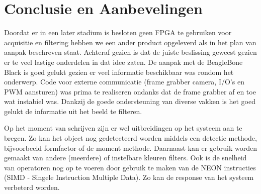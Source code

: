 \chapter{Conclusie en Aanbevelingen}
\label{chap:conclusion}


Doordat er in een later stadium is besloten geen FPGA te gebruiken voor 
acquisitie en filtering hebben we een ander product opgeleverd als in 
het plan van aanpak beschreven staat. Achteraf gezien is dat de juiste 
beslissing geweest gezien er te veel lastige onderdelen in dat idee 
zaten.
De aanpak met de BeagleBone Black is goed gelukt gezien er veel informatie 
beschikbaar was rondom het onderwerp. Code voor externe communicatie 
(frame grabber camera, I/O's en PWM aansturen) was prima te realiseren 
ondanks dat de frame grabber af en toe wat instabiel was.
Dankzij de goede ondersteuning van diverse vakken is het goed gelukt de 
informatie uit het beeld te filteren.

Op het moment van schrijven zijn er wel uitbreidingen op het systeem aan 
te bregen. Zo kan het object nog gedetecteerd worden middels een detectie 
methode, bijvoorbeeld formfactor of de moment methode. Daarnaast kan er 
gebruik worden gemaakt van andere (meerdere) of instelbare kleuren filters. 
Ook is de snelheid van operatoren nog op te voeren door gebruik te maken 
van de NEON instructies (SIMD - Singele Instruction Multiple Data). Zo 
kan de response van het systeem verbeterd worden.